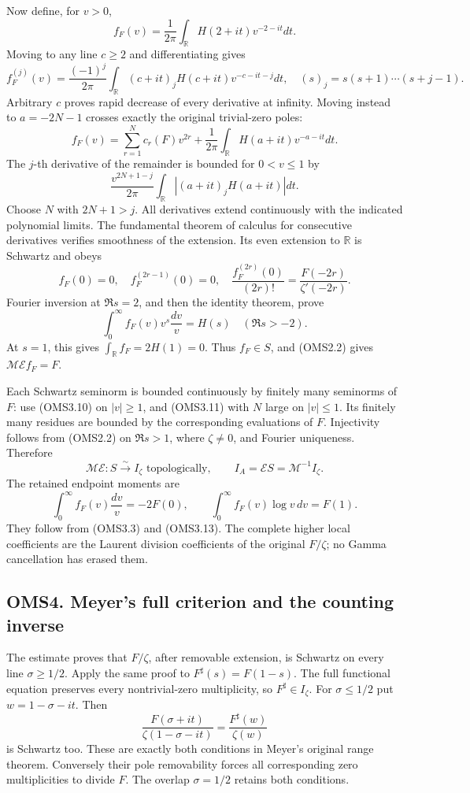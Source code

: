 Now define, for \(v>0\), \[
f_F(v)=\frac1{2\pi}\int_{\mathbb R}H(2+it)v^{-2-it}dt.
\tag{OMS3.9}
\] Moving to any line \(c\ge2\) and differentiating gives \[
f_F^{(j)}(v)=\frac{(-1)^j}{2\pi}
\int_{\mathbb R}(c+it)_jH(c+it)v^{-c-it-j}dt,
\quad(s)_j=s(s+1)\cdots(s+j-1).
\tag{OMS3.10}
\] Arbitrary \(c\) proves rapid decrease of every derivative at
infinity. Moving instead to \(a=-2N-1\) crosses exactly the original
trivial-zero poles: \[
f_F(v)=\sum_{r=1}^{N}c_r(F)v^{2r}
+\frac1{2\pi}\int_{\mathbb R}H(a+it)v^{-a-it}dt.
\tag{OMS3.11}
\] The \(j\)-th derivative of the remainder is bounded for \(0<v\le1\)
by \[
\frac{v^{2N+1-j}}{2\pi}\int_{\mathbb R}|(a+it)_jH(a+it)|dt.
\] Choose \(N\) with \(2N+1>j\). All derivatives extend continuously
with the indicated polynomial limits. The fundamental theorem of
calculus for consecutive derivatives verifies smoothness of the
extension. Its even extension to \(\mathbb R\) is Schwartz and obeys \[
f_F(0)=0,\quad f_F^{(2r-1)}(0)=0,\quad
\frac{f_F^{(2r)}(0)}{(2r)!}=\frac{F(-2r)}{\zeta'(-2r)}.
\tag{OMS3.12}
\] Fourier inversion at \(\Re s=2\), and then the identity theorem,
prove \[
\int_0^\infty f_F(v)v^s\frac{dv}{v}=H(s)\quad(\Re s>-2).
\tag{OMS3.13}
\] At \(s=1\), this gives \(\int_{\mathbb R}f_F=2H(1)=0\). Thus
\(f_F\in S\), and (OMS2.2) gives \(\mathcal M\mathcal Ef_F=F\).

Each Schwartz seminorm is bounded continuously by finitely many
seminorms of \(F\): use (OMS3.10) on \(|v|\ge1\), and (OMS3.11) with
\(N\) large on \(|v|\le1\). Its finitely many residues are bounded by
the corresponding evaluations of \(F\). Injectivity follows from
(OMS2.2) on \(\Re s>1\), where \(\zeta\ne0\), and Fourier uniqueness.
Therefore \[
\boxed{\mathcal M\mathcal E:S\xrightarrow{\sim}I_\zeta
\text{ topologically},\qquad
I_A=\mathcal ES=\mathcal M^{-1}I_\zeta.}
\tag{OMS3.14}
\] The retained endpoint moments are \[
\int_0^\infty f_F(v)\frac{dv}{v}=-2F(0),\qquad
\int_0^\infty f_F(v)\log v\,dv=F(1).
\tag{OMS3.15}
\] They follow from (OMS3.3) and (OMS3.13). The complete higher local
coefficients are the Laurent division coefficients of the original
\(F/\zeta\); no Gamma cancellation has erased them.

\subsection{OMS4. Meyer's full criterion and the counting
inverse}\label{oms4.-meyers-full-criterion-and-the-counting-inverse}

The estimate proves that \(F/\zeta\), after removable extension, is
Schwartz on every line \(\sigma\ge1/2\). Apply the same proof to
\(F^\sharp(s)=F(1-s)\). The full functional equation preserves every
nontrivial-zero multiplicity, so \(F^\sharp\in I_\zeta\). For
\(\sigma\le1/2\) put \(w=1-\sigma-it\). Then \[
\frac{F(\sigma+it)}{\zeta(1-\sigma-it)}
=\frac{F^\sharp(w)}{\zeta(w)}
\tag{OMS4.1}
\] is Schwartz too. These are exactly both conditions in Meyer's
original range theorem. Conversely their pole removability forces all
corresponding zero multiplicities to divide \(F\). The overlap
\(\sigma=1/2\) retains both conditions.

